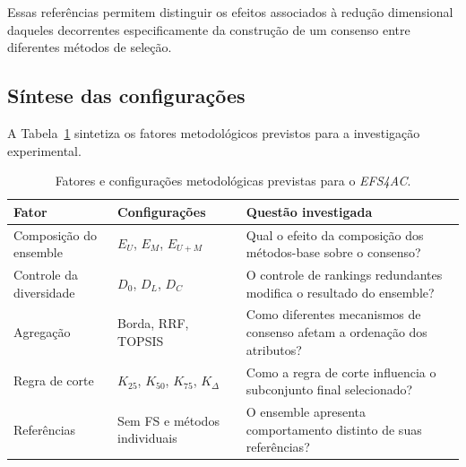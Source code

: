 Essas referências permitem distinguir os efeitos associados à redução
dimensional daqueles decorrentes especificamente da construção de um consenso
entre diferentes métodos de seleção.


\subsection{Síntese das configurações}
\label{subsec:ac-efs-config-sintese}

A Tabela~\ref{tab:configuracoes-ac-efs} sintetiza os fatores metodológicos
previstos para a investigação experimental.

\begin{table}[ht]
    \centering
    \small
    \caption{Fatores e configurações metodológicas previstas para o
    \textit{EFS4AC}.}
    \label{tab:configuracoes-ac-efs}
    \renewcommand{\arraystretch}{1.20}

    \begin{tabular}{p{3.3cm}p{4.8cm}p{5.3cm}}
        \hline
        \textbf{Fator}
        & \textbf{Configurações}
        & \textbf{Questão investigada} \\
        \hline

        Composição do ensemble
        & $E_U$, $E_M$, $E_{U+M}$
        & Qual o efeito da composição dos métodos-base sobre o consenso? \\

        Controle da diversidade
        & $D_0$, $D_L$, $D_C$
        & O controle de rankings redundantes modifica o resultado do ensemble? \\

        Agregação
        & Borda, RRF, TOPSIS
        & Como diferentes mecanismos de consenso afetam a ordenação dos atributos? \\

        Regra de corte
        & $K_{25}$, $K_{50}$, $K_{75}$, $K_{\Delta}$
        & Como a regra de corte influencia o subconjunto final selecionado? \\

        Referências
        & Sem FS e métodos individuais
        & O ensemble apresenta comportamento distinto de suas referências? \\

        \hline
    \end{tabular}
\end{table}

